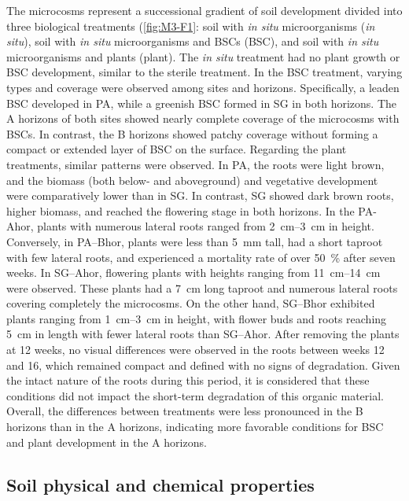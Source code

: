 The microcosms represent a successional gradient of soil development divided into three biological treatments (\ref{fig:M3-F1}: soil with \textit{in situ} microorganisms (\textit{in situ}), soil with \textit{in situ} microorganisms and BSCs (BSC), and soil with \textit{in situ} microorganisms and plants (plant). The \textit{in situ} treatment had no plant growth or BSC development, similar to the sterile treatment. In the BSC treatment, varying types and coverage were observed among sites and horizons. Specifically, a leaden BSC developed in PA, while a greenish BSC formed in SG in both horizons. The A horizons of both sites showed nearly complete coverage of the microcosms with BSCs. In contrast, the B horizons showed patchy coverage without forming a compact or extended layer of BSC on the surface. Regarding the plant treatments, similar patterns were observed. In PA, the roots were light brown, and the biomass (both below- and aboveground) and vegetative development were comparatively lower than in SG. In contrast, SG showed dark brown roots, higher biomass, and reached the flowering stage in both horizons. In the PA-Ahor, plants with numerous lateral roots ranged from \SIrange{2}{3}{\centi\metre} in height. Conversely, in PA–Bhor, plants were less than \SI{5}{\milli\metre} tall, had a short taproot with few lateral roots, and experienced a mortality rate of over \SI{50}{\percent} after seven weeks. In SG–Ahor, flowering plants with heights ranging from \SIrange{11}{14}{\centi\metre} were observed. These plants had a \SI{7}{\centi\metre} long taproot and numerous lateral roots covering completely the microcosms. On the other hand, SG–Bhor exhibited plants ranging from \SIrange{1}{3}{\centi\metre} in height, with flower buds and roots reaching \SI{5}{\centi\metre} in length with fewer lateral roots than SG–Ahor. After removing the plants at 12 weeks, no visual differences were observed in the roots between weeks 12 and 16, which remained compact and defined with no signs of degradation. Given the intact nature of the roots during this period, it is considered that these conditions did not impact the short-term degradation of this organic material. Overall, the differences between treatments were less pronounced in the B horizons than in the A horizons, indicating more favorable conditions for BSC and plant development in the A horizons.

\subsection{Soil physical and chemical properties}

